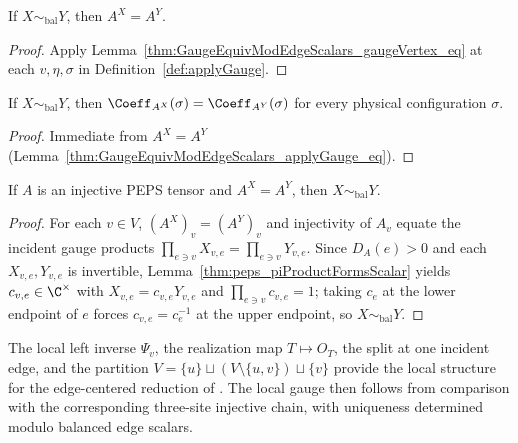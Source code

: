 \begin{lemma}%
    \label{thm:GaugeEquivModEdgeScalars_applyGauge_eq}
    \leanok
    If $X\sim_{\mathrm{bal}}Y$, then $A^X=A^Y$.
\end{lemma}
\begin{proof}\leanok
    Apply Lemma~\ref{thm:GaugeEquivModEdgeScalars_gaugeVertex_eq} at each
    $v,\eta,\sigma$ in Definition~\ref{def:applyGauge}.
\end{proof}

\begin{lemma}%
    \label{thm:GaugeEquivModEdgeScalars_applyGauge_sameState}
    \leanok
    If $X\sim_{\mathrm{bal}}Y$, then $\Coeff_{A^X}(\sigma)=\Coeff_{A^Y}(\sigma)$
    for every physical configuration $\sigma$.
\end{lemma}
\begin{proof}\leanok
    Immediate from $A^X=A^Y$ (Lemma~\ref{thm:GaugeEquivModEdgeScalars_applyGauge_eq}).
\end{proof}

\begin{lemma}%
    \label{thm:gauge_unique_mod_edge_scalars}
    \leanok
    If $A$ is an injective PEPS tensor and $A^X=A^Y$, then $X\sim_{\mathrm{bal}}Y$.
\end{lemma}
\begin{proof}\leanok
    For each $v\in V$, $(A^X)_v=(A^Y)_v$ and injectivity of $A_v$ equate the
    incident gauge products $\prod_{e\ni v}X_{v,e}=\prod_{e\ni v}Y_{v,e}$.
    Since $D_A(e)>0$ and each $X_{v,e},Y_{v,e}$ is invertible,
    Lemma~\ref{thm:peps_piProductFormsScalar} yields $c_{v,e}\in\C^\times$
    with $X_{v,e}=c_{v,e}Y_{v,e}$ and $\prod_{e\ni v}c_{v,e}=1$; taking $c_e$
    at the lower endpoint of $e$ forces $c_{v,e}=c_e^{-1}$ at the upper
    endpoint, so $X\sim_{\mathrm{bal}}Y$.
\end{proof}

\begin{remark}
    The local left inverse $\Psi_v$, the realization map $T \mapsto O_T$,
    the split at one incident edge, and the partition
    $V = \{u\} \sqcup (V \setminus \{u,v\}) \sqcup \{v\}$ provide the local
    structure for the edge-centered reduction of
    \cite[Section~3]{Molnar2018NormalPEPS}. The local gauge then follows from
    comparison with the corresponding three-site injective chain, with uniqueness
    determined modulo balanced edge scalars.
\end{remark}
